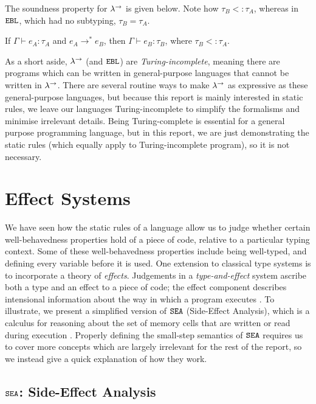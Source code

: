 The soundness property for $\lambda^{\rightarrow}$ is given below. Note how $\tau_B <: \tau_A$, whereas in $\mathtt{EBL}$, which had no subtyping, $\tau_B = \tau_A$.

\begin{theorem}
If $\Gamma \vdash e_A: \tau_A$ and $e_A \longrightarrow^* e_B$, then $\Gamma \vdash e_B: \tau_B$, where $\tau_B <: \tau_A$.
\end{theorem}

As a short aside, $\lambda^{\rightarrow}$ (and $\mathtt{EBL}$) are \textit{Turing-incomplete}, meaning there are programs which can be written in general-purpose languages that cannot be written in $\lambda^{\rightarrow}$. There are several routine ways to make $\lambda^{\rightarrow}$ as expressive as these general-purpose languages, but because this report is mainly interested in static rules, we leave our languages Turing-incomplete to simplify the formalisms and minimise irrelevant details. Being Turing-complete is essential for a general purpose programming language, but in this report, we are just demonstrating the static rules (which equally apply to Turing-incomplete program), so it is not necessary.

\section{Effect Systems}

We have seen how the static rules of a language allow us to judge whether certain well-behavedness properties hold of a piece of code, relative to a particular typing context. Some of these well-behavedness properties include being well-typed, and defining every variable before it is used. One extension to classical type systems is to incorporate a theory of \textit{effects}. Judgements in a \textit{type-and-effect} system ascribe both a type and an effect to a piece of code; the effect component describes intensional information about the way in which a program executes \cite{nielson99}. To illustrate, we present a simplified version of $\mathtt{SEA}$ (Side-Effect Analysis), which is a calculus for reasoning about the set of memory cells that are written or read during execution \cite{nielson99}. Properly defining the small-step semantics of $\mathtt{SEA}$ requires us to cover more concepts which are largely irrelevant for the rest of the report, so we instead give a quick explanation of how they work.

\subsection{$\mathtt{SEA}$: Side-Effect Analysis}

